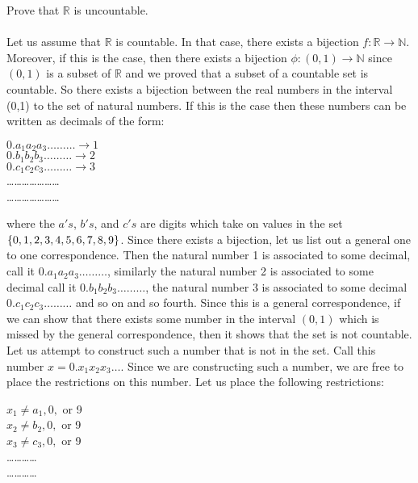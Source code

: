 \documentclass[12pt]{article}
\begin{document}
\problem Prove that $\mathbb{R}$ is uncountable. \\ \\
Let us assume that $\mathbb{R}$ is countable. In that case, there exists a bijection $f: \mathbb{R} \rightarrow \mathbb{N}$. Moreover, if this is the case, then there exists a bijection $\phi: (0,1) \rightarrow \mathbb{N}$ since $(0,1)$ is a subset of $\mathbb{R}$ and we proved that a subset of a countable set is countable. So there exists a bijection between the real numbers in the interval (0,1) to the set of natural numbers. If this is the case then these numbers can be written as decimals of the form: 
\begin{center}
$0.a_{1}a_{2}a_{3}\ldots \ldots \ldots \rightarrow 1$ \\
$0.b_{1}b_{2}b_{3}\ldots \ldots \ldots \rightarrow 2$ \\
$0.c_{1}c_{2}c_{3}\ldots \ldots \ldots \rightarrow 3$ \\
\ldots \ldots \ldots \ldots \ldots \ldots  \ldots \\
\ldots \ldots \ldots \ldots \ldots \ldots  \ldots
\end{center}
where the $a's$, $b's$, and $c's$ are digits which take on values in the set $\left\{0, 1, 2, 3, 4, 5, 6, 7, 8, 9\right\}$.
Since there exists a bijection, let us list out a general one to one correspondence. Then the natural number 1 is associated to some decimal, call it $0.a_{1}a_{2}a_{3}\ldots \ldots \ldots$, similarly the natural number 2 is associated to some decimal call it $0.b_{1}b_{2}b_{3}\ldots \ldots \ldots$, the natural number 3 is associated to some decimal $0.c_{1}c_{2}c_{3}\ldots \ldots \ldots$ and so on and so fourth. Since this is a general correspondence, if we can show that there exists some number in the interval $(0,1)$ which is missed by the general correspondence, then it shows that the set is not countable. Let us attempt to construct such a number that is not in the set. Call this number $x= 0.x_{1}x_{2}x_{3}\ldots$. Since we are constructing such a number, we are free to place the restrictions on this number. Let us place the following restrictions:
\begin{center}
$x_{1} \neq a_{1}, 0,$ or 9\\
$x_{2} \neq b_{2}, 0,$ or 9\\
$x_{3} \neq c_{3}, 0,$ or 9\\
\ldots \ldots \ldots \ldots \\
\ldots \ldots \ldots \ldots \\
\end{center}
\end{document}
